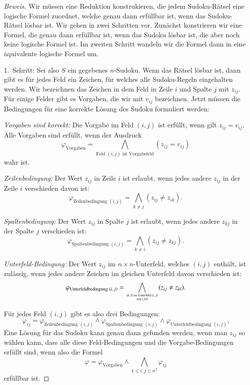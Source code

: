 \begin{proof}[Beweis]
Wir müssen eine Reduktion konstrukieren, die jedem Sudoku-Rätsel
eine logische Formel zuordnet, welche genau dann erfüllbar ist, wenn
das Sudoku-Rätsel lösbar ist. Wir gehen in zwei Schritten vor. 
Zunächst konstrieren wir eine Formel, die genau dann erfüllbar ist,
wenn das Sudoku lösbar ist, die aber noch keine logische Formel ist.
Im zweiten Schritt wandeln wir die Formel dann in eine äquivalente
logische Formel um.

1.~Schritt: Sei also $S$ ein gegebenes $n$-Sudoku. Wenn das Rätsel lösbar
ist, dann gibt es für jedes Feld ein Zeichen, für welches alle Sudoku-Regeln
eingehalten werden. Wir bezeichnen das Zeichen in dem Feld in Zeile $i$
und Spalte $j$ mit $z_{ij}$. Für einige Felder gibt es Vorgaben, die wir mit
$v_{ij}$ bezeichnen. Jetzt müssen die Bedingungen für eine korrekte
Lösung des Sudoku formuliert werden:
\begin{compactenum}
\item {\em Vorgaben sind korrekt:} Die Vorgabe im Feld $(i,j)$ ist erfüllt,
wenn gilt $z_{ij}=v_{ij}$. Alle Vorgaben sind erfüllt, wenn der Ausdruck
\[
\varphi_{\text{Vorgaben}}=\bigwedge_{\text{Feld $(i,j)$ ist Vorgabefeld}}(z_{ij}=v_{ij})
\]
wahr ist.
\item {\em Zeilenbedingung:} Der Wert $z_{ij}$ in Zeile $i$ ist erlaubt,
wenn jedes andere $z_{ij}$ in der Zeile $i$ verschieden davon ist:
\[
\varphi_{\text{Zeilenbedingung $(i,j)$}}
=
\bigwedge_{k\ne j}(z_{ij}\ne z_{ik}).
\]
\item {\em Spaltenbedingung:} Der Wert $z_{ij}$ in Spalte $j$ ist erlaubt,
wenn jedes andere $z_{kj}$ in der Spalte $j$ verschieden ist:
\[
\varphi_{\text{Spaltenbedingung $(i,j)$}}
=
\bigwedge_{k\ne i}(z_{ij}\ne z_{kj}).
\]
\item {\em Unterfeld-Bedingung:} Der Wert $z_{ij}$ im $n\times n$-Unterfeld,
welches $(i,j)$ enthält, ist zulässig, wenn jedes andere Zeichen im gleichen
Unterfeld davon verschieden ist:
\[
\varphi_
{\text{Unterfeldbedingung $(i,j)$}}
=
\bigwedge_{\myatop{\text{$(k,l)$ im Unterfeld $(i,j)$}}{i\ne k\wedge j\ne l}}(z_{ij}\ne z_{kl}).
\]
\end{compactenum}
Für jedes Feld $(i,j)$ gibt es also drei Bedingungen:
\[
\varphi_{ij}=
\varphi_{\text{Zeilenbedingung $(i,j)$}}
\wedge
\varphi_{\text{Spaltenbedingung $(i,j)$}}
\wedge
\varphi_{\text{Unterfeldbedingung $(i,j)$}}.
\]
Eine Lösung für das Sudoku kann genau dann gefunden werden, wenn man
$z_{ij}$ so wählen kann, dass alle diese Feld-Bedingungen und die
Vorgabe-Bedingungen erfüllt sind, wenn also die Formel
\begin{equation}
\varphi=
\varphi_{\text{Vorgaben}}\wedge
\bigwedge_{1\le i,j\le n^2}
\varphi_{ij}
\label{sudoku-formel}
\end{equation}
erfüllbar ist.


\end{proof}
